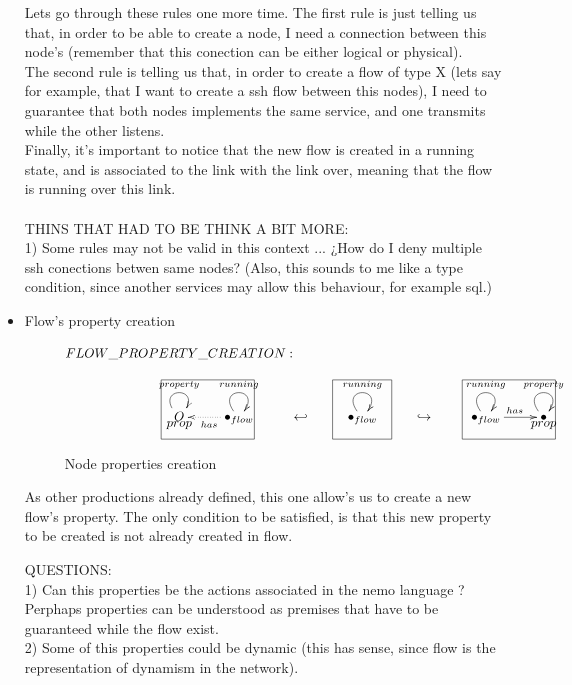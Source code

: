 \documentclass[envcountsect,runningheads]{llncs}
\begin{document}
\begin{itemize}
  Lets go through these rules one more time. The first rule is just telling us that, in order to be 
  able to
  create a node, I need a connection between this node's (remember that this conection can be either
  logical or physical).\\
  The second rule is telling us that, in order to create a flow of type X (lets say for example, 
  that I want to create a ssh flow between this nodes), I need to guarantee that 
  both nodes implements the same service, and one transmits while the other 
  listens.\\
  Finally, it's important to notice that the new flow is created in a running state, 
  and is associated to the link with the link over, meaning that the flow is running over 
  this link. \\
  \\
  THINS THAT HAD TO BE THINK A BIT MORE: \\
  1) Some rules may not be valid in this context ... ¿How do I deny multiple ssh 
  conections betwen same nodes? (Also, this sounds to me like a type condition, since another
  services may allow this behaviour, for example sql.) \\
 
  \item Flow's property creation
  \begin{figure}[H]
    \[
       \xymatrix@C=25pt@R=16pt
       {
         {}\POS[]-<0pc,0pc>\drop{FLOW\_PROPERTY\_CREATION:}
         \\
         \\
         O \ar@(ul,ur)^{property} \POS[]-<0pc,.5pc>\drop{prop} &
         {\bullet}_{flow} \ar@(ul,ur)^{running} \ar@{.>}^{has}[l]
         \POS[]+<-2pc,.5pc> *+=<6pc,3.8pc>[F-]{} & {\hookleftarrow} &
         {\bullet}_{flow} \ar@(ul,ur)^{running}
         \POS[]+<0pc,.5pc> *+=<3.8pc,3.8pc>[F-]{} & {\hookrightarrow} &
         {\bullet}_{flow} \ar@(ul,ur)^{running} \ar@{->}^{has}[r]
         \POS[]+<1.5pc,.5pc> *+=<6pc,3.8pc>[F-]{} &
         {\bullet} \ar@(ul,ur)^{property} \POS[]-<0pc,.5pc>\drop{prop}
       }
    \]
    \caption{Node properties creation}
    \protect\label{fig:nodecreation}
  \end{figure}
  As other productions already defined, this one allow's us to create a new 
  flow's property. The only condition to be satisfied, is that this new property 
  to be created is not already created in flow.
  
  QUESTIONS:\\
  1) Can this properties be the actions associated in the nemo language ? 
  Perphaps properties can be understood as premises that have to be guaranteed 
  while the flow exist. \\
  2) Some of this properties could be dynamic (this has sense, since flow is the representation 
  of dynamism in the network). \\
    
\end{itemize} 
\end{document}
